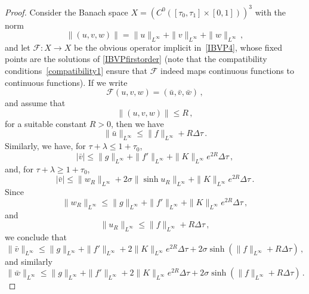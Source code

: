 \documentclass[10pt]{amsart}
\newcommand{\cF}{\mathcal{F}}
\newcommand{\rig}{R}
\begin{document}
\begin{proof}
Consider the Banach space $X= \left(C^0\left([\tau_0, \tau_1] \times [0,1]\right)\right)^3$ with the norm
\begin{equation}
\|(u,v,w)\| = \| u \|_{L^\infty} + \| v \|_{L^\infty} + \| w \|_{L^\infty} \, ,
\end{equation}
and let $\cF:X \to X$ be the obvious operator implicit in~\eqref{IBVP4}, whose fixed points are the solutions of \eqref{IBVPfirstorder} (note that the compatibility conditions~\eqref{compatibility1} ensure that $\cF$ indeed maps continuous functions to continuous functions). If we write
\begin{equation}
\cF(u,v,w) = (\bar{u},\bar{v},\bar{w}) \, ,
\end{equation}
and assume that
\begin{equation}
\|(u,v,w)\| \leq R \, ,
\end{equation}
for a suitable constant $R>0$, then we have
\begin{equation}
\| \bar{u} \|_{L^\infty} \leq \| f \|_{L^\infty} + R \Delta \tau \, .
\end{equation}
Similarly, we have, for $\tau + \lambda \leq 1 + \tau_0$,
\begin{equation}
| \bar{v} | \leq \| g \|_{L^\infty} + \| f' \|_{L^\infty} + \| K \|_{L^\infty} e^{2R} \Delta \tau \, ,
\end{equation}
and, for $ \tau + \lambda\geq 1 + \tau_0$,
\begin{equation}
| \bar{v} | \leq \| w_\rig \|_{L^\infty} + 2 \sigma \| \sinh u_\rig \|_{L^\infty} + \| K \|_{L^\infty} e^{2R} \Delta \tau \, .
\end{equation}
Since
\begin{equation}
\| w_\rig \|_{L^\infty} \leq \| g \|_{L^\infty} + \| f' \|_{L^\infty} + \| K \|_{L^\infty} e^{2R} \Delta \tau \, ,
\end{equation}
and
\begin{equation}
\| u_\rig \|_{L^\infty} \leq \| f \|_{L^\infty} + R \Delta \tau \, ,
\end{equation}
we conclude that
\begin{equation}
\| \bar{v} \|_{L^\infty} \leq \| g \|_{L^\infty} + \| f' \|_{L^\infty} + 2 \| K \|_{L^\infty} e^{2R} \Delta \tau + 2 \sigma \sinh \left( \| f \|_{L^\infty} + R \Delta \tau \right)  \, ,
\end{equation}
and similarly
\begin{equation}
\| \bar{w} \|_{L^\infty} \leq \| g \|_{L^\infty} + \| f' \|_{L^\infty} + 2 \| K \|_{L^\infty} e^{2R} \Delta \tau + 2 \sigma \sinh \left( \| f \|_{L^\infty} + R \Delta \tau \right)  \, .

\end{equation}
\end{proof}
\end{document}
